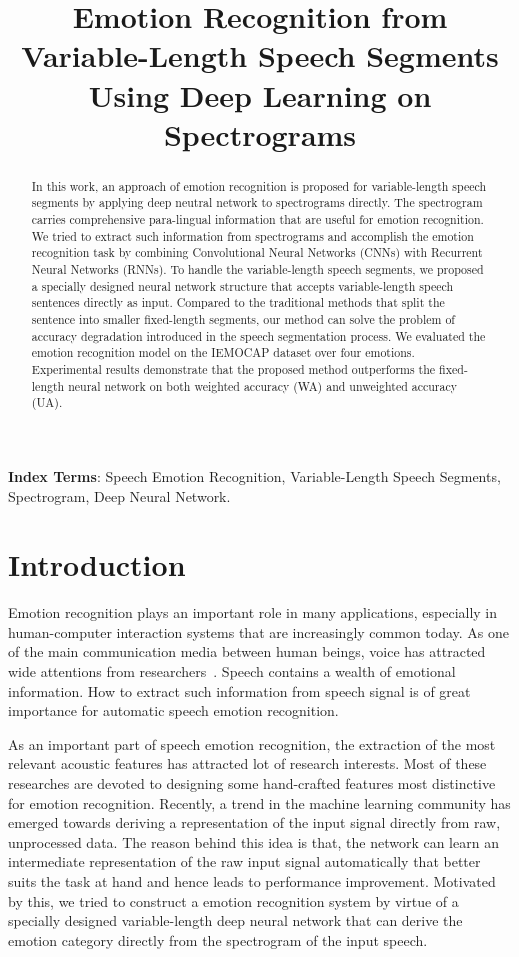 \documentclass[a4paper]{article}
\title{Emotion Recognition from Variable-Length Speech Segments Using Deep Learning on Spectrograms}
\begin{document}
\maketitle
%
\begin{abstract}
In this work, an approach of emotion recognition is proposed for variable-length speech segments by applying deep neutral network to spectrograms directly. The spectrogram carries comprehensive para-lingual information that are useful for emotion recognition. We tried to extract such information from spectrograms and accomplish the emotion recognition task by combining Convolutional Neural Networks (CNNs) with Recurrent Neural Networks (RNNs). To handle the variable-length speech segments, we proposed a specially designed neural network structure that accepts variable-length speech sentences directly as input. Compared to the traditional methods that split the sentence into smaller fixed-length segments, our method can solve the problem of accuracy degradation introduced in the speech segmentation process. We evaluated the emotion recognition model on the IEMOCAP dataset over four emotions. Experimental results demonstrate that the proposed method outperforms the fixed-length neural network on both weighted accuracy (WA) and unweighted accuracy (UA).
\end{abstract}

\noindent\textbf{Index Terms}: Speech Emotion Recognition, Variable-Length Speech Segments, Spectrogram, Deep Neural Network.

\section{Introduction}

Emotion recognition plays an important role in many applications, especially in human-computer interaction systems that are increasingly common today. As one of the main communication media between human beings, voice has attracted wide attentions from researchers~\cite{ayadi2011}. Speech contains a wealth of emotional information. How to extract such information from speech signal is of great importance for automatic speech emotion recognition.

As an important part of speech emotion recognition, the extraction of the most relevant acoustic features has attracted lot of research interests. Most of these researches are devoted to designing some hand-crafted features most distinctive for emotion recognition. Recently, a trend in the machine learning community has emerged towards deriving a representation of the input signal directly from raw, unprocessed data. The reason behind this idea is that, the network can learn an intermediate representation of the raw input signal automatically that better suits the task at hand and hence leads to performance improvement. Motivated by this, we tried to construct a emotion recognition system by virtue of a specially designed variable-length deep neural network that can derive the emotion category directly from the spectrogram of the input speech.
\end{document}
